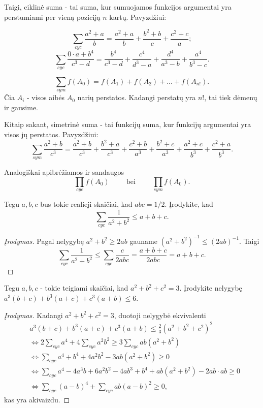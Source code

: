 Taigi, ciklinė suma - tai suma, kur sumuojamos funkcijos argumentai
yra perstumiami per vieną poziciją $n$ kartų. Pavyzdžiui:

$$\sum_{cyc}{\frac{a^2+a}{b}}=\frac{a^2+a}{b}+\frac{b^2+b}{c}+\frac{c^2+c}{a};$$
$$\sum_{cyc}{\frac{0\cdot
a+b^4}{c^3-d}}=\frac{b^4}{c^3-d}+\frac{c^4}{d^3-a}+\frac{d^4}{a^3-b}+\frac{a^4}{b^3-c}.$$

\begin{api}
  $$\sum_{sym}{f(A_{0})=f(A_{1})+f(A_{2})+...+f(A_{n!})}.$$ Čia $A_{i}$ -
  visos aibės $A_{0}$ narių perstatos. Kadangi perstatų yra $n!$, tai
  tiek dėmenų ir gausime.
\end{api}

Kitaip sakant, simetrinė suma - tai funkcijų suma, kur funkcijų argumentai
yra visos jų perstatos. Pavyzdžiui:
$$\sum_{sym}{\frac{a^2+b}{c^3}}=\frac{a^2+b}{c^3}+\frac{b^2+a}{c^3}+
\frac{c^2+b}{a^3}+\frac{b^2+c}{a^3}+\frac{a^2+c}{b^3}+\frac{c^2+a}{b^3}.$$

Analogiškai apibrėžiamos ir sandaugos
$$\prod_{cyc}{f(A_0)}\hspace{1cm}\mbox{bei}\hspace{1cm}
\prod_{sym}{f(A_0)}.$$

\begin{pavnr}[L.M.]
  Tegu $a,b,c$ bus tokie realieji skaičiai, kad $abc=1/2$. Įrodykite, kad
  $$\sum_{cyc}{\frac{1}{a^2+b^2}}\leq a+b+c.$$
\end{pavnr}

\begin{proof}[Įrodymas]
  Pagal nelygybę $a^2+b^2\geq 2ab$ gauname $(a^2+b^2)^{-1}\leq (2ab)^{-1}$.
  Taigi $$\sum_{cyc}{\frac{1}{a^2+b^2}}\leq
  \sum_{cyc}{\frac{c}{2abc}}=\frac{a+b+c}{2abc}=a+b+c.$$
\end{proof}

\begin{pavnr}
  Tegu $a,b,c$ - tokie teigiami skaičiai, kad $a^2+b^2+c^2=3$. Įrodykite
  nelygybę $a^3(b+c)+b^3(a+c)+c^3(a+b)\leq 6$.
\end{pavnr}

\begin{proof}[Įrodymas]
  Kadangi $a^2+b^2+c^2=3$, duotoji nelygybė ekvivalenti
  \begin{align*}
    & a^3(b+c)+b^3(a+c)+c^3(a+b)\leq \frac{2}{3}(a^2+b^2+c^2)^2 \\
    & \Leftrightarrow 2\sum_{cyc}a^4+4\sum_{cyc}a^2b^2 \geq 3\sum_{cyc}ab(a^2+b^2) \\
    & \Leftrightarrow \sum_{cyc}a^4+b^4+4a^2b^2-3ab(a^2+b^2)\geq 0 \\
    & \Leftrightarrow \sum_{cyc}a^4-4a^3b+6a^2b^2-4ab^3+b^4 +ab(a^2+b^2)-2ab \cdot ab \geq 0 \\
    & \Leftrightarrow \sum_{cyc}(a-b)^4+\sum_{cyc}ab(a-b)^2 \geq 0,
  \end{align*}
  kas yra akivaizdu.
\end{proof}

